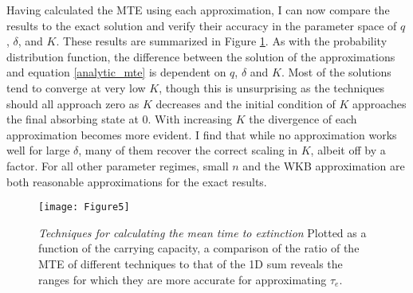 \iffalse %
By omitting negligeable terms from the full solution to the MTE, equation \ref{analytic_mte}, we can heavily reduce the computational runtime in our calculation.
This becomes important at large population sizes, as the the number of terms in the analytical solution scale with the maximal size of the population.
$\tau_1$, the time it takes for the population to go extinct from a size of one individual, is also the first term in our sum and the dominant term in the solution.
Setting $\tau_e \sim \tau_1$ turns out to be a fine approximation.
However it is only a useful approximation for reducing computation runtime: we learn no more about the dependencies of the MTE on $q$ and $\delta$ than we do for the exact solution. 
\fi

Having calculated the MTE using each approximation, I can now compare the results to the exact solution and verify their accuracy in the parameter space of $q$, $\delta$, and $K$.
These results are summarized in Figure \ref{mte_techn}.
As with the probability distribution function, the difference between the solution of the approximations and equation \ref{analytic_mte} is dependent on $q$, $\delta$ and $K$. 
Most of the solutions tend to converge at very low $K$, though this is unsurprising as the techniques should all approach zero as $K$ decreases and the initial condition of $K$ approaches the final absorbing state at $0$. 
With increasing $K$ the divergence of each approximation becomes more evident. 
I find that while no approximation works well for large $\delta$, many of them recover the correct scaling in $K$, albeit off by a factor. %
For all other parameter regimes, small $n$ and the WKB approximation are both reasonable approximations for the exact results. %

\begin{figure}[ht!]
	\centering
	\texttt{[image: Figure5]}
	\caption{\emph{Techniques for calculating the mean time to extinction} Plotted as a function of the carrying capacity, a comparison of the ratio of the MTE of different techniques to that of the 1D sum reveals the ranges for which they are more accurate for approximating $\tau_{e}$.} \label{mte_techn}
\end{figure}


